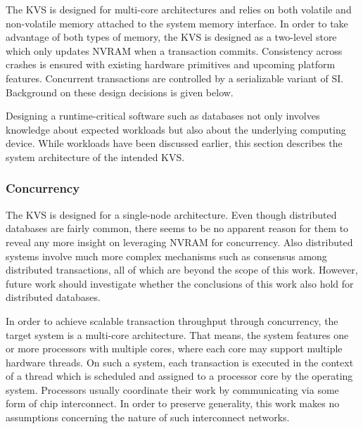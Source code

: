 The KVS is designed for multi-core architectures and relies on both volatile and
non-volatile memory attached to the system memory interface. In order to take
advantage of both types of memory, the KVS is designed as a two-level store
which only updates NVRAM when a transaction commits. Consistency across crashes
is ensured with existing hardware primitives and upcoming platform features.
Concurrent transactions are controlled by a serializable variant of SI.
Background on these design decisions is given below.

Designing a runtime-critical software such as databases not only involves
knowledge about expected workloads but also about the underlying computing
device. While workloads have been discussed earlier, this section describes the
system architecture of the intended KVS.

\subsubsection{Concurrency}

The KVS is designed for a single-node architecture. Even though distributed
databases are fairly common, there seems to be no apparent reason for them to
reveal any more insight on leveraging NVRAM for concurrency. Also distributed
systems involve much more complex mechanisms such as consensus among distributed
transactions, all of which are beyond the scope of this work. However, future
work should investigate whether the conclusions of this work also hold for
distributed databases.

In order to achieve scalable transaction throughput through concurrency, the
target system is a multi-core architecture. That means, the system features one
or more processors with multiple cores, where each core may support multiple
hardware threads. On such a system, each transaction is executed in the context
of a thread which is scheduled and assigned to a processor core by the operating
system. Processors usually coordinate their work by communicating via some form
of chip interconnect. In order to preserve generality, this work makes no
assumptions concerning the nature of such interconnect networks.

